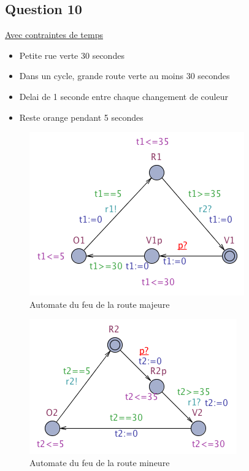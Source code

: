 \documentclass[11pt]{article}
\begin{document}
\subsection{Question 10}\label{question-10}

\href{https://github.com/masters-info-nantes/hong-cheng-lv/blob/master/ressources/part3/Q10-AvecContraintesTemps.xml}{Avec contraintes de temps}

\begin{itemize}
	\item Petite rue verte 30 secondes
	\item Dans un cycle, grande route verte au moins 30 secondes
	\item Delai de 1 seconde entre chaque changement de couleur
	\item Reste orange pendant 5 secondes
\end{itemize}

\begin{figure}[H]
	\centering
	\includegraphics{ressources/part3/Q10-1.png}
	\caption{Automate du feu de la route majeure}
\end{figure}

\begin{figure}[H]
	\centering
	\includegraphics{ressources/part3/Q10-2.png}
	\caption{Automate du feu de la route mineure}
\end{figure}
\end{document}
